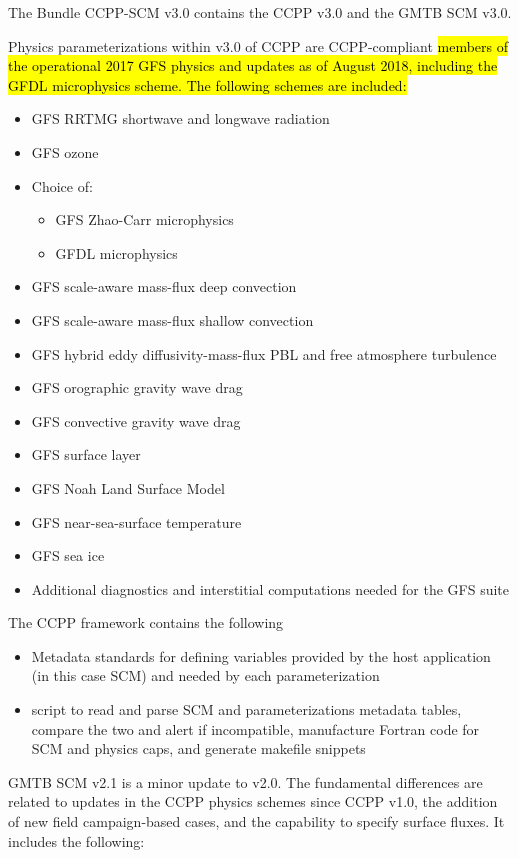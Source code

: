 The Bundle CCPP-SCM v3.0 contains the CCPP v3.0 and the GMTB SCM v3.0.

Physics parameterizations within v3.0 of CCPP are CCPP-compliant \hl{members of the operational 2017 GFS physics and updates as of August 2018, including the GFDL microphysics scheme. The following schemes are included:}
\begin{itemize}
	\item GFS RRTMG shortwave and longwave radiation
	\item GFS ozone
	\item Choice of:
	\begin{itemize}
	\item GFS Zhao-Carr microphysics
	\item GFDL microphysics
	\end{itemize}
	\item GFS scale-aware mass-flux deep convection
	\item GFS scale-aware mass-flux shallow convection
	\item GFS hybrid eddy diffusivity-mass-flux PBL and free atmosphere turbulence
	\item GFS orographic gravity wave drag
	\item GFS convective gravity wave drag
	\item GFS surface layer
	\item GFS Noah Land Surface Model
	\item GFS near-sea-surface temperature
	\item GFS sea ice
	\item Additional diagnostics and interstitial computations needed for the GFS suite
\end{itemize}

The CCPP framework contains the following
\begin{itemize}
\item Metadata standards for defining variables provided by the host application (in this case SCM) and needed by each parameterization
\item {} script to read and parse SCM and parameterizations metadata tables, compare the two and alert if incompatible, manufacture Fortran code for SCM and physics caps, and generate makefile snippets
\end{itemize}

GMTB SCM v2.1 is a minor update to v2.0. The fundamental differences are related to updates in the CCPP physics schemes since CCPP v1.0, the addition of new field campaign-based cases, and the capability to specify surface fluxes. It includes the following:

